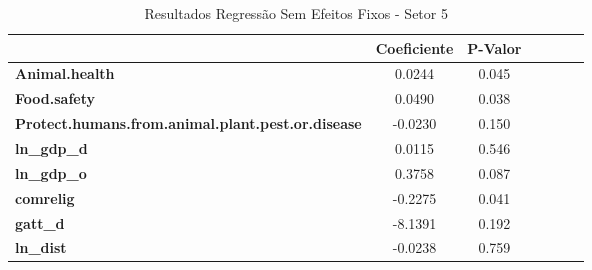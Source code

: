 \begin{table}[ht]
    \begin{center}
        \begin{tabular}{lcccccc}
            & \textbf{Coeficiente} & \textbf{P-Valor} \\
            \midrule
\textbf{Animal.health}                                    &       0.0244 &         0.045\\
\textbf{Food.safety}                                      &       0.0490 &         0.038\\
\textbf{Protect.humans.from.animal.plant.pest.or.disease} &      -0.0230 &         0.150\\
\textbf{ln\_gdp\_d}                                       &       0.0115 &         0.546\\
\textbf{ln\_gdp\_o}                                       &       0.3758 &         0.087\\
\textbf{comrelig}                                         &      -0.2275 &         0.041\\
\textbf{gatt\_d}                                          &      -8.1391 &         0.192\\
\textbf{ln\_dist}                                         &      -0.0238 &         0.759\\
\bottomrule
\end{tabular}
\caption{Resultados Regressão Sem Efeitos Fixos - Setor 5}
\end{center}
\end{table}